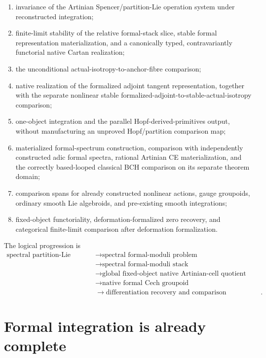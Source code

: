 \begin{enumerate}
    Spencer, and native mapping discrepancy systems;
    \item invariance of the Artinian Spencer/partition-Lie operation system
    under reconstructed integration;
    \item finite-limit stability of the relative formal-stack slice, stable
    formal representation materialization, and a canonically typed,
    contravariantly functorial native Cartan realization;
    \item the unconditional actual-isotropy-to-anchor-fibre comparison;
    \item native realization of the formalized adjoint tangent representation,
    together with the separate nonlinear stable
    formalized-adjoint-to-stable-actual-isotropy comparison;
    \item one-object integration and the parallel Hopf-derived-primitives
    output, without manufacturing an unproved Hopf/partition comparison map;
    \item materialized formal-spectrum construction, comparison with independently
    constructed adic formal spectra, rational Artinian CE materialization, and
    the correctly based-looped classical BCH comparison on its separate theorem domain;
    \item comparison spans for already constructed nonlinear actions, gauge
    groupoids, ordinary smooth Lie algebroids, and pre-existing smooth
    integrations;
    \item fixed-object functoriality, deformation-formalized zero recovery, and
    categorical finite-limit comparison after deformation formalization.
\end{enumerate}

The logical progression is
\[
\boxed{
\begin{aligned}
\text{spectral partition-Lie algebroid}
&\longrightarrow
\text{spectral formal-moduli problem}
\\
&\longrightarrow
\text{spectral formal-moduli stack}
\\
&\longrightarrow
\text{global fixed-object native Artinian-cell quotient}
\\
&\longrightarrow
\text{native formal Cech groupoid}
\\
&\longrightarrow
\text{differentiation recovery and comparison discrepancies}.
\end{aligned}}
\]

\section{Formal integration is already complete}
\label{sec:bnli-formal-integration}

